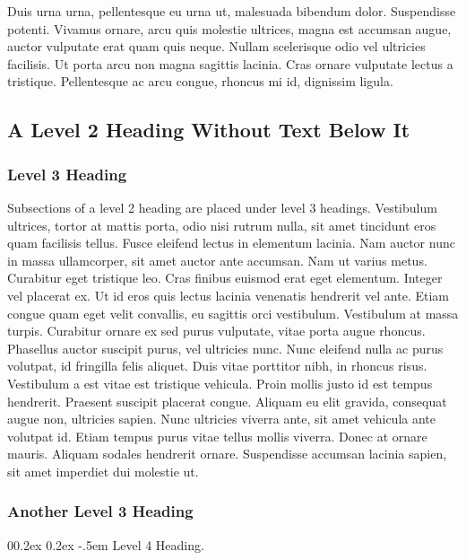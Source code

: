 \documentclass[
  man,
  floatsintext,
  longtable,
  nolmodern,
  notxfonts,
  notimes,
  mask,
  colorlinks=true,linkcolor=blue,citecolor=blue,urlcolor=blue]{apa7}
\makeatletter
\renewcommand{\paragraph}{\@startsection{paragraph}{4}{\parindent}%
	{0\baselineskip \@plus 0.2ex \@minus 0.2ex}%
	{-.5em}%
	{\normalfont\normalsize\bfseries\typesectitle}}
\makeatother
\begin{document}
Duis urna urna, pellentesque eu urna ut, malesuada bibendum dolor.
Suspendisse potenti. Vivamus ornare, arcu quis molestie ultrices, magna
est accumsan augue, auctor vulputate erat quam quis neque. Nullam
scelerisque odio vel ultricies facilisis. Ut porta arcu non magna
sagittis lacinia. Cras ornare vulputate lectus a tristique. Pellentesque
ac arcu congue, rhoncus mi id, dignissim ligula.

\subsection{A Level 2 Heading Without Text Below
It}\label{a-level-2-heading-without-text-below-it}

\subsubsection{Level 3 Heading}\label{level-3-heading}

Subsections of a level 2 heading are placed under level 3 headings.
Vestibulum ultrices, tortor at mattis porta, odio nisi rutrum nulla, sit
amet tincidunt eros quam facilisis tellus. Fusce eleifend lectus in
elementum lacinia. Nam auctor nunc in massa ullamcorper, sit amet auctor
ante accumsan. Nam ut varius metus. Curabitur eget tristique leo. Cras
finibus euismod erat eget elementum. Integer vel placerat ex. Ut id eros
quis lectus lacinia venenatis hendrerit vel ante. Etiam congue quam eget
velit convallis, eu sagittis orci vestibulum. Vestibulum at massa
turpis. Curabitur ornare ex sed purus vulputate, vitae porta augue
rhoncus. Phasellus auctor suscipit purus, vel ultricies nunc. Nunc
eleifend nulla ac purus volutpat, id fringilla felis aliquet. Duis vitae
porttitor nibh, in rhoncus risus. Vestibulum a est vitae est tristique
vehicula. Proin mollis justo id est tempus hendrerit. Praesent suscipit
placerat congue. Aliquam eu elit gravida, consequat augue non, ultricies
sapien. Nunc ultricies viverra ante, sit amet vehicula ante volutpat id.
Etiam tempus purus vitae tellus mollis viverra. Donec at ornare mauris.
Aliquam sodales hendrerit ornare. Suspendisse accumsan lacinia sapien,
sit amet imperdiet dui molestie ut.

\subsubsection{Another Level 3 Heading}\label{another-level-3-heading}

\paragraph{Level 4 Heading.}\label{level-4-heading}
\end{document}
